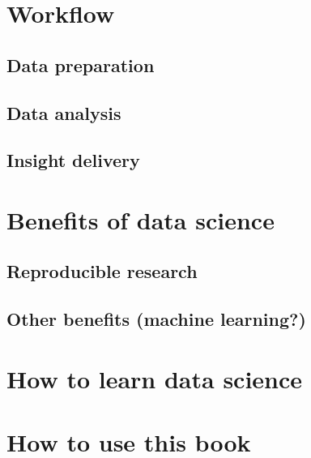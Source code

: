 \documentclass[
]{book}
\begin{document}
\hypertarget{workflow}{%
\section{Workflow}\label{workflow}}

\hypertarget{data-preparation}{%
\subsection{Data preparation}\label{data-preparation}}

\hypertarget{data-analysis}{%
\subsection{Data analysis}\label{data-analysis}}

\hypertarget{insight-delivery}{%
\subsection{Insight delivery}\label{insight-delivery}}

\hypertarget{benefits-of-data-science}{%
\section{Benefits of data science}\label{benefits-of-data-science}}

\hypertarget{reproducible-research}{%
\subsection{Reproducible research}\label{reproducible-research}}

\hypertarget{other-benefits-machine-learning}{%
\subsection{Other benefits (machine learning?)}\label{other-benefits-machine-learning}}

\hypertarget{how-to-learn-data-science}{%
\section{How to learn data science}\label{how-to-learn-data-science}}

\hypertarget{how-to-use-this-book}{%
\section{How to use this book}\label{how-to-use-this-book}}
\end{document}
